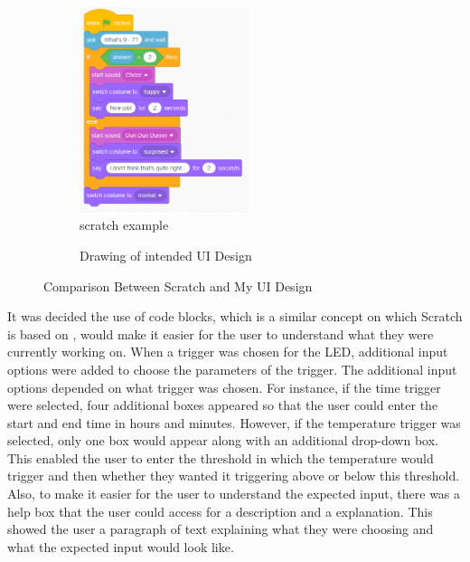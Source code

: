 \begin{figure}[h]
\begin{subfigure}{0.5\textwidth}
\includegraphics[width=0.9\linewidth, height=6cm]{Scratch}
\caption{scratch example}
\end{subfigure}
\begin{subfigure}{0.5\textwidth}
\caption{Drawing of intended UI Design}
\end{subfigure}

\caption{Comparison Between Scratch and My UI Design}
\end{figure}

It was decided the use of code blocks, which is a similar concept on which Scratch is based on \cite{Scratch}, would make it easier for the user to understand what they were currently working on. When a trigger was chosen for the LED, additional input options were added to choose the parameters of the trigger. The additional input options depended on what trigger was chosen. For instance, if the time trigger were selected, four additional boxes appeared so that the user could enter the start and end time in hours and minutes. However, if the temperature trigger was selected, only one box would appear along with an additional drop-down box. This enabled the user to enter the threshold in which the temperature would trigger and then whether they wanted it triggering above or below this threshold. Also, to make it easier for the user to understand the expected input, there was a help box that the user could access for a description and a explanation.  This showed the user a paragraph of text explaining what they were choosing and what the expected input would look like.
